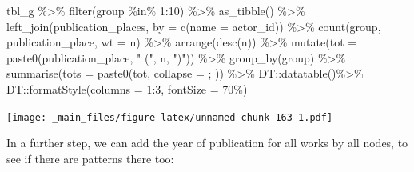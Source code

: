 \documentclass[
]{book}
\newenvironment{Shaded}{\begin{snugshade}}{\end{snugshade}}
\newcommand{\AttributeTok}[1]{\textcolor[rgb]{0.77,0.63,0.00}{#1}}
\newcommand{\DecValTok}[1]{\textcolor[rgb]{0.00,0.00,0.81}{#1}}
\newcommand{\FunctionTok}[1]{\textcolor[rgb]{0.00,0.00,0.00}{#1}}
\newcommand{\NormalTok}[1]{#1}
\newcommand{\OtherTok}[1]{\textcolor[rgb]{0.56,0.35,0.01}{#1}}
\newcommand{\SpecialCharTok}[1]{\textcolor[rgb]{0.00,0.00,0.00}{#1}}
\newcommand{\StringTok}[1]{\textcolor[rgb]{0.31,0.60,0.02}{#1}}
\begin{document}
\begin{Shaded}
\begin{Highlighting}[]
\NormalTok{tbl\_g }\SpecialCharTok{\%\textgreater{}\%} \FunctionTok{filter}\NormalTok{(group }\SpecialCharTok{\%in\%} \DecValTok{1}\SpecialCharTok{:}\DecValTok{10}\NormalTok{) }\SpecialCharTok{\%\textgreater{}\%} 
  \FunctionTok{as\_tibble}\NormalTok{() }\SpecialCharTok{\%\textgreater{}\%} 
  \FunctionTok{left\_join}\NormalTok{(publication\_places, }\AttributeTok{by =} \FunctionTok{c}\NormalTok{(}\StringTok{\textquotesingle{}name\textquotesingle{}} \OtherTok{=} \StringTok{\textquotesingle{}actor\_id\textquotesingle{}}\NormalTok{)) }\SpecialCharTok{\%\textgreater{}\%} 
  \FunctionTok{count}\NormalTok{(group, publication\_place, }\AttributeTok{wt =}\NormalTok{ n) }\SpecialCharTok{\%\textgreater{}\%} 
  \FunctionTok{arrange}\NormalTok{(}\FunctionTok{desc}\NormalTok{(n)) }\SpecialCharTok{\%\textgreater{}\%} 
  \FunctionTok{mutate}\NormalTok{(}\AttributeTok{tot =} \FunctionTok{paste0}\NormalTok{(publication\_place, }\StringTok{" ("}\NormalTok{, n, }\StringTok{")"}\NormalTok{)) }\SpecialCharTok{\%\textgreater{}\%} 
  \FunctionTok{group\_by}\NormalTok{(group) }\SpecialCharTok{\%\textgreater{}\%} \FunctionTok{summarise}\NormalTok{(}\AttributeTok{tots =} \FunctionTok{paste0}\NormalTok{(tot, }\AttributeTok{collapse =} \StringTok{\textquotesingle{}; \textquotesingle{}}\NormalTok{)) }\SpecialCharTok{\%\textgreater{}\%} 
\NormalTok{  DT}\SpecialCharTok{::}\FunctionTok{datatable}\NormalTok{()}\SpecialCharTok{\%\textgreater{}\%} 
\NormalTok{  DT}\SpecialCharTok{::}\FunctionTok{formatStyle}\NormalTok{(}\AttributeTok{columns =} \DecValTok{1}\SpecialCharTok{:}\DecValTok{3}\NormalTok{, }\AttributeTok{fontSize =} \StringTok{\textquotesingle{}70\%\textquotesingle{}}\NormalTok{)}
\end{Highlighting}
\end{Shaded}

\texttt{[image: \_main\_files/figure-latex/unnamed-chunk-163-1.pdf]}

In a further step, we can add the year of publication for all works by all nodes, to see if there are patterns there too:
\end{document}
